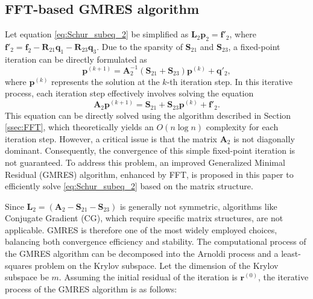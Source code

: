 \documentclass[preprint]{elsarticle}
\begin{document}
\subsection{FFT-based GMRES algorithm}
\label{ssec:GMRES}
Let equation \eqref{eq:Schur_subeq_2} be simplified as $\boldsymbol{L}_{2}\boldsymbol{p}_{2}=\boldsymbol{f}'_{2}$, where $\boldsymbol{f}'_{2} = \boldsymbol{f}_{2}-\boldsymbol{R}_{21}\boldsymbol{q}_{1}-\boldsymbol{R}_{23}\boldsymbol{q}_{3}$. Due to the sparsity of $\boldsymbol{S}_{21}$ and $\boldsymbol{S}_{23}$, a fixed-point iteration can be directly formulated as
\begin{equation}
    \label{eq:basic_iter}
    \boldsymbol{p}^{\left(k+1\right)}=\boldsymbol{A}_2^{-1}\left(\boldsymbol{S}_{21}+\boldsymbol{S}_{23}\right)\boldsymbol{p}^{\left(k\right)}+\boldsymbol{q}'_{2},
\end{equation}
where $\boldsymbol{p}^{\left(k\right)}$ represents the solution at the $k$-th iteration step. In this iterative process, each iteration step effectively involves solving the equation
\begin{equation}
    \label{eq:basic_iter_equ}
    \boldsymbol{A}_2\boldsymbol{p}^{\left(k+1\right)}=\boldsymbol{S}_{21}+\boldsymbol{S}_{23}\boldsymbol{p}^{\left(k\right)}+\boldsymbol{f}'_{2}.
\end{equation}
This equation can be directly solved using the algorithm described in Section \ref{ssec:FFT}, which theoretically yields an $O\left(n\log n\right)$ complexity for each iteration step. However, a critical issue is that the matrix $\boldsymbol{A}_2$ is not diagonally dominant. Consequently, the convergence of this simple fixed-point iteration is not guaranteed. To address this problem, an improved Generalized Minimal Residual (GMRES) algorithm, enhanced by FFT, is proposed in this paper to efficiently solve \eqref{eq:Schur_subeq_2} based on the matrix structure.

Since $\boldsymbol{L}_{2}=\left(\boldsymbol{A}_{2}-\boldsymbol{S}_{21}-\boldsymbol{S}_{23}\right)$ is generally not symmetric, algorithms like Conjugate Gradient (CG), which require specific matrix structures, are not applicable. GMRES is therefore one of the most widely employed choices, balancing both convergence efficiency and stability. The computational process of the GMRES algorithm can be decomposed into the Arnoldi process and a least-squares problem on the Krylov subspace. Let the dimension of the Krylov subspace be $m$. Assuming the initial residual of the iteration is $\boldsymbol{r}^{\left(0\right)}$, the iterative process of the GMRES algorithm is as follows:
\end{document}
